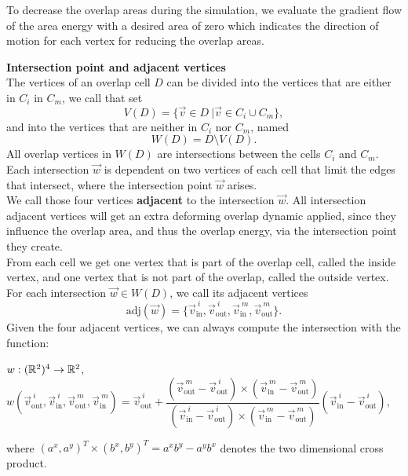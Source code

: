 To decrease the overlap areas during the simulation, we evaluate the gradient flow of the area energy with a desired area of zero which indicates the direction of motion for each vertex for reducing the overlap areas.

\newcommand{\vargs}{\ensuremath{\vec{v}_{\text{out}}^{\: i}, \vec{v}_{\text{in}}^{\: i}, \vec{v}_{\text{out}}^{\: m}, \vec{v}_{\text{in}}^{\: m}}}
\newcommand{\tu}{\ensuremath{(\vec{v}_{\text{out}}^{\: m} - \vec{v}_{\text{out}}^{\: i}) \times (\vec{v}_{\text{in}}^{\: m} - \vec{v}_{\text{out}}^{\: m})}}
\newcommand{\tl}{\ensuremath{(\vec{v}_{\text{in}}^{\: i} - \vec{v}_{\text{out}}^{\: i}) \times (\vec{v}_{\text{in}}^{\: m} - \vec{v}_{\text{out}}^{\: m})}}
\newcommand{\tz}{\ensuremath{\dfrac{\tu}{\tl}}}
\newcommand{\w}{\ensuremath{\vec{v}_{\text{out}}^{\: i} + \tz (\vec{v}_{\text{in}}^{\: i} - \vec{v}_{\text{out}}^{\: i})}}

\begin{definition} \textbf{Intersection point and adjacent vertices} \\
	The vertices of an overlap cell $D$ can be divided into the vertices that are either in $C_i$ in $C_m$, we call that set 
	\[V(D) = \{\vec{v} \in D \:| \vec{v} \in C_i \cup C_m \}, \] 
	and into the vertices that are neither in $C_i$ nor $C_m$, named 
	\[W(D) = D \setminus V(D).\]
	All overlap vertices in $W(D)$ are intersections between the cells $C_i$ and $C_m$. \\
	Each intersection $\vec{w}$ is dependent on two vertices of each cell that limit the edges that intersect, where the intersection point $\vec{w}$ arises. \\
	We call those four vertices \textbf{adjacent} to the intersection $\vec{w}$. 
	All intersection adjacent vertices will get an extra deforming overlap dynamic applied, since they influence the overlap area, and thus the overlap energy, via the intersection point they create. \\
	From each cell we get one vertex that is part of the overlap cell, called the inside vertex, and one vertex that is not part of the overlap, called the outside vertex. 
	For each intersection $\vec{w} \in W(D)$, we call its adjacent vertices 
	\[\text{adj}(\vec{w}) = \{\vec{v}_{\text{in}}^{\: i}, \vec{v}_{\text{out}}^{\: i}, \vec{v}_{\text{in}}^{\: m}, \vec{v}_{\text{out}}^{\: m} \}. \]
	Given the four adjacent vertices, we can always compute the intersection with the function:
	\begin{center}
		$w: (\mathbb{R}^2)^4 \rightarrow \mathbb{R}^2$, \\[0.5em]
		$w(\vargs) = \vec{v}_{\text{out}}^{\: i} + \dfrac{(\vec{v}_{\text{out}}^{\: m} - \vec{v}_{\text{out}}^{\: i}) \times (\vec{v}_{\text{in}}^{\: m} - \vec{v}_{\text{out}}^{\: m})}{(\vec{v}_{\text{in}}^{\: i} - \vec{v}_{\text{out}}^{\: i}) \times (\vec{v}_{\text{in}}^{\: m} - \vec{v}_{\text{out}}^{\: m})} (\vec{v}_{\text{in}}^{\: i} - \vec{v}_{\text{out}}^{\: i})$,
	\end{center}
	where $(a^x, a^y)^T \times (b^x, b^y)^T = a^x b^y - a^y b^x$ denotes the two dimensional cross product. \\
\end{definition}

